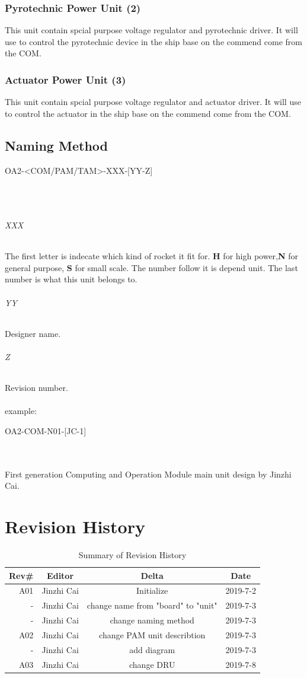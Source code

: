 \documentclass[12pt,article]{memoir}
\begin{document}
\subsection{Pyrotechnic Power Unit (2)}
This unit contain spcial purpose voltage regulator and pyrotechnic driver. It will use to control the pyrotechnic device in the ship base on the commend come from the COM. 
\subsection{Actuator Power Unit (3)}
This unit contain spcial purpose voltage regulator and actuator driver. It will use to control the actuator in the ship base on the commend come from the COM.
\section{Naming Method}
\begin{LARGE}
OA2-<COM/PAM/TAM>-XXX-[YY-Z]
\end{LARGE}\\\\
\subparagraph{XXX}
The first letter is indecate which kind of rocket it fit for. \textbf{H} for high power,\textbf{N} for general purpose, \textbf{S} for small scale. The number follow it is depend unit. The last number is what this unit belongs to. 
\subparagraph{YY}
Designer name.
\subparagraph{Z}
Revision number.\\\\
example: 
\begin{large}
OA2-COM-N01-[JC-1]
\end{large}\\\\
First generation Computing and Operation Module main unit design by Jinzhi Cai.
\newpage
\chapter{Revision History}%
\begin{table}[H]
	\centering
	\begin{tabu}{r || c | c | c }
		Rev\# & Editor & Delta & Date\\ \hline
		A01 & Jinzhi Cai & Initialize  & 2019-7-2\\
		- & Jinzhi Cai & change name from "board" to "unit" & 2019-7-3\\
		- & Jinzhi Cai & change naming method & 2019-7-3\\ \hline
		A02 & Jinzhi Cai & change PAM unit describtion & 2019-7-3\\
		- & Jinzhi Cai & add diagram & 2019-7-3\\ \hline
		A03 & Jinzhi Cai & change DRU & 2019-7-8\\ \hline
	\end{tabu}
	\caption{Summary of Revision History}
	\label{tab:edatools}
\end{table}
\end{document}
